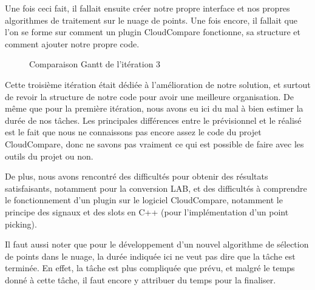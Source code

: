 \documentclass[12pt,titlepage,french]{article}
\begin{document}
Une fois ceci fait, il fallait ensuite créer notre propre interface et nos propres algorithmes de traitement sur le nuage de points. Une fois encore, il fallait que l'on se forme sur comment un plugin CloudCompare fonctionne, sa structure et comment ajouter notre propre code.

\begin{figure}[H]
    \caption{\label{} Comparaison Gantt de l'itération 3}
\end{figure}

Cette troisième itération était dédiée à l'amélioration de notre solution, et surtout de revoir la structure de notre code pour avoir une meilleure organisation. De même que pour la première itération, nous avons eu ici du mal à bien estimer la durée de nos tâches. Les principales différences entre le prévisionnel et le réalisé est le fait que nous ne connaissons pas encore assez le code du projet CloudCompare, donc ne savons pas vraiment ce qui est possible de faire avec les outils du projet ou non. \newline

De plus, nous avons rencontré des difficultés pour obtenir des résultats satisfaisants, notamment pour la conversion LAB, et des difficultés à comprendre le fonctionnement d'un plugin sur le logiciel CloudCompare, notamment le principe des signaux et des slots en C++ (pour l'implémentation d'un point picking). \newline

Il faut aussi noter que pour le développement d'un nouvel algorithme de sélection de points dans le nuage, la durée indiquée ici ne veut pas dire que la tâche est terminée. En effet, la tâche est plus compliquée que prévu, et malgré le temps donné à cette tâche, il faut encore y attribuer du temps pour la finaliser.
\end{document}
